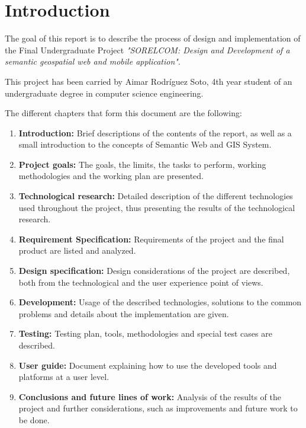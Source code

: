 \chapter{Introduction}\label{cha:intro}

The goal of this report is to describe the process of design and implementation of the Final Undergraduate Project \textit{"SORELCOM: Design and Development of a semantic geospatial web and mobile application"}.

This project has been carried by Aimar Rodr\'iguez Soto, 4th year student of an undergraduate degree in computer science engineering.

The different chapters that form this document are the following:

\begin{enumerate}
	\item \textbf{Introduction:} Brief descriptions of the contents of the report, as well as a small introduction to the concepts of Semantic Web and GIS System.
	
	\item \textbf{Project goals:} The goals, the limits, the tasks to perform, working methodologies and the working plan are presented.
	
	\item \textbf{Technological research:} Detailed description of the different technologies used throughout the project, thus presenting the results of the technological research.
	
	\item \textbf{Requirement Specification:} Requirements of the project and the final product are listed and analyzed.
	
	\item \textbf{Design specification:} Design considerations of the project are described, both from the technological and the user experience point of views.
	
	\item \textbf{Development:} Usage of the described technologies, solutions to the common problems and details about the implementation are given.
	
	\item \textbf{Testing:} Testing plan, tools, methodologies and special test cases are described. 
	
	\item \textbf{User guide:} Document explaining how to use the developed tools and platforms at a user level.
	
	\item \textbf{Conclusions and future lines of work:} Analysis of the results of the project and further considerations, such as improvements and future work to be done.
\end{enumerate}

